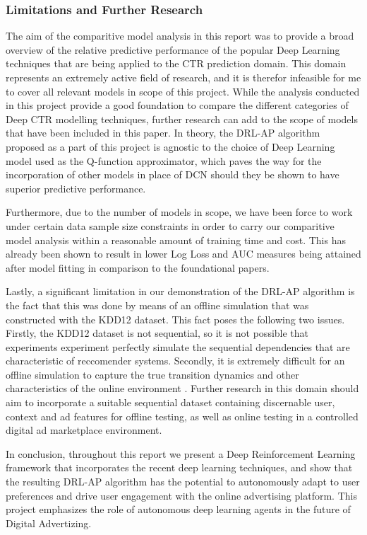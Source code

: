 \documentclass{mldsmsc}
\begin{document}
\subsubsection{Limitations and Further Research}

The aim of the comparitive model analysis in this report was to provide a broad overview
of the relative predictive performance of the popular Deep Learning techniques that are being
applied to the CTR prediction domain. This domain represents an extremely active field of
research, and it is therefor infeasible for me to cover all relevant models in scope of this project.
While the analysis conducted in this project provide a good foundation to compare the different
categories of Deep CTR modelling techniques, further research can add to the scope of models
that have been included in this paper. In theory, the DRL-AP algorithm proposed as a part of this project
is agnostic to the choice of Deep Learning model used as the Q-function approximator, which paves
the way for the incorporation of other models in place of DCN should they be shown to have
superior predictive performance.

Furthermore, due to the number of models in scope, we have been force to work under certain data sample
size constraints in order to carry our comparitive model analysis within a reasonable amount
of training time and cost. This has already been shown to result in lower Log Loss and AUC measures
being attained after model fitting in comparison to the foundational papers.

Lastly, a significant limitation in our demonstration of the DRL-AP algorithm is the
fact that this was done by means of an offline simulation that was constructed with the
KDD12 dataset. This fact poses the following two issues. Firstly, the KDD12 dataset is not sequential, so it is not possible
that experiments experiment perfectly simulate the sequential dependencies that are characteristic of
reccomender systems. Secondly, it is extremely difficult for an offline
simulation to capture the true transition dynamics and other characteristics of the online environment
\citep{pike-burke2024LearnigAgents,RefWorks:wang2024deep,RefWorks:zheng2018drn:}.
Further research in this domain should aim to incorporate a suitable sequential dataset
containing discernable user, context and ad features for offline testing, as well as online
testing in a controlled digital ad marketplace environment.

In conclusion, throughout this report we present a Deep Reinforcement Learning
framework that incorporates the recent deep learning techniques, and show that the resulting
DRL-AP algorithm has the potential to autonomously adapt to user preferences and drive user
engagement with the online advertising platform. This project emphasizes the role of autonomous
deep learning agents in the future of Digital Advertizing.
\end{document}
